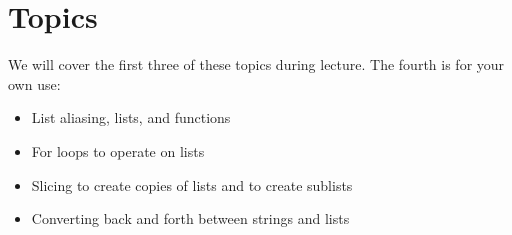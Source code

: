\documentclass[letterpaper,10pt,english]{sphinxmanual}
\begin{document}
\section{Topics}
\label{\detokenize{lecture_notes/lec10_lists2:topics}}
We will cover the first three of these topics during lecture.  The
fourth is for your own use:
\begin{itemize}
\item {} 
List aliasing, lists, and functions

\item {} 
For loops to operate on lists

\item {} 
Slicing to create copies of lists and to create sublists

\item {} 
Converting back and forth between strings and lists

\end{itemize}
\end{document}
